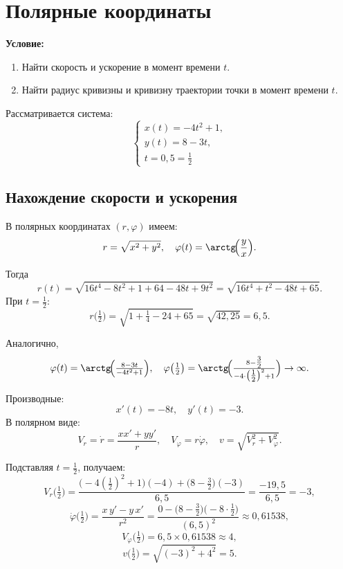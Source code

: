 \section{Полярные координаты}

\textbf{Условие:}
\begin{enumerate}
    \item Найти скорость и ускорение в момент времени \(t\).
    \item Найти радиус кривизны и кривизну траектории точки в момент времени \(t\).
\end{enumerate}

Рассматривается система:
\[
\begin{cases}
x(t) = -4t^2 + 1, \\
y(t) = 8 - 3t, \\
t = 0{,}5 = \frac{1}{2}
\end{cases}
\]

\subsection{Нахождение скорости и ускорения}

В полярных координатах \((r,\varphi)\) имеем:
\[
r = \sqrt{x^2 + y^2}, 
\quad
\varphi(t) = \arctg\!\Bigl(\frac{y}{x}\Bigr).
\]

Тогда
\[
r(t) = \sqrt{16t^4 - 8t^2 + 1 + 64 - 48t + 9t^2} 
      = \sqrt{16t^4 + t^2 - 48t + 65}.
\]
При \(t = \tfrac12\):
\[
r\bigl(\tfrac12\bigr) 
= \sqrt{1 + \tfrac14 - 24 + 65}
= \sqrt{42{,}25}
= 6{,}5.
\]

Аналогично,
\[
\varphi(t) = \arctg\!\Bigl(\tfrac{8 - 3t}{-4t^2 + 1}\Bigr), 
\quad
\varphi\bigl(\tfrac12\bigr) 
= \arctg\!\Bigl(\tfrac{8 - \tfrac32}{-4\cdot\bigl(\tfrac12\bigr)^2 + 1}\Bigr)
\to \infty.
\]

Производные:
\[
x'(t) = -8t,
\quad
y'(t) = -3.
\]
В полярном виде:
\[
V_r = \dot{r} = \frac{x x' + y y'}{r},
\quad
V_\varphi = r \dot{\varphi},
\quad
v = \sqrt{V_r^2 + V_\varphi^2}.
\]

Подставляя \(t=\tfrac12\), получаем:
\[
V_r\bigl(\tfrac12\bigr) 
= \frac{\bigl(-4(\tfrac12)^2 + 1\bigr)(-4) + \bigl(8 - \tfrac32\bigr)(-3)}{6{,}5}
= \frac{-19{,}5}{6{,}5} = -3,
\]
\[
\dot{\varphi}\bigl(\tfrac12\bigr) 
= \frac{x\,y' - y\,x'}{r^2}
= \frac{0 - \bigl(8 - \tfrac32\bigr)\bigl(-8\cdot\tfrac12\bigr)}{(6{,}5)^2}
\approx 0{,}61538,
\]
\[
V_\varphi\bigl(\tfrac12\bigr) 
= 6{,}5 \times 0{,}61538
\approx 4,
\]
\[
v\bigl(\tfrac12\bigr) 
= \sqrt{(-3)^2 + 4^2}
= 5.
\]

